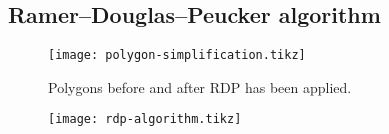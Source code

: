 \subsection{Ramer–Douglas–Peucker algorithm}

\begin{figure}[H]
  \centering
  \texttt{[image: polygon-simplification.tikz]}
  \caption{Polygons before and after RDP has been applied.}
\end{figure}

\begin{figure}
  \centering
  \texttt{[image: rdp-algorithm.tikz]}
  \label{}
\end{figure}
